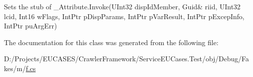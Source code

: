 Sets the stub of \-\_\-\-Attribute.\-Invoke(U\-Int32 disp\-Id\-Member, Guid\& riid, U\-Int32 lcid, Int16 w\-Flags, Int\-Ptr p\-Disp\-Params, Int\-Ptr p\-Var\-Result, Int\-Ptr p\-Excep\-Info, Int\-Ptr pu\-Arg\-Err)



The documentation for this class was generated from the following file\-:\begin{DoxyCompactItemize}
\item 
D\-:/\-Projects/\-E\-U\-C\-A\-S\-E\-S/\-Crawler\-Framework/\-Service\-E\-U\-Cases.\-Test/obj/\-Debug/\-Fakes/m/\hyperlink{m_2f_8cs}{f.\-cs}\end{DoxyCompactItemize}
